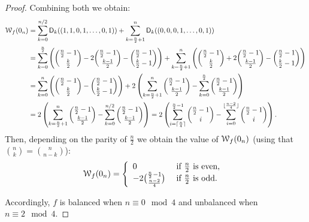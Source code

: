 \documentclass[11pt]{llncs}
\begin{document}
\begin{proof}
Combining both we obtain:
\begin{align*}
\wt{f}(0_n)&=\sum_{k=0}^{n/2}\Dnka{n}{k}{(1,1,0,1,\ldots,0,1)}+ \sum_{k=\frac{n}{2}+1}^{n}\Dnka{n}{k}{(0,0,0,1,\ldots,0,1)}\\
&=\sum_{k=0}^{\frac{n}{2}} \left(\binom{\frac{n}{2}-1}{\frac{k}{2}} -2 \binom{\frac{n}{2}-1}{\frac{k-1}{2}} - \binom{\frac{n}{2}-1}{\frac{k}{2}-1} \right)+ \sum_{k=\frac{n}{2}+1}^{n}   \left(  \binom{\frac{n}{2}-1}{\frac{k}{2}} +2 \binom{\frac{n}{2}-1}{\frac{k-1}{2}} - \binom{\frac{n}{2}-1}{\frac{k}{2}-1} \right)\\
&=\sum_{k=0}^{n}\left( \binom{\frac{n}{2}-1}{\frac{k}{2}} - \binom{\frac{n}{2}-1}{\frac{k}{2}-1}\right) 
+ 2 \left( \sum_{k=\frac{n}{2}+1}^{n} \binom{\frac{n}{2}-1}{\frac{k-1}{2}} - \sum_{k=0}^{\frac{n}{2}} \binom{\frac{n}{2}-1}{\frac{k-1}{2}}\right)\\
&=2 \left( \sum_{k=\frac{n}{2}+1}^{n} \binom{\frac{n}{2}-1}{\frac{k-1}{2}} - \sum_{k=0}^{n/2} \binom{\frac{n}{2}-1}{\frac{k-1}{2}}\right)
=2 \left( \sum_{i=\lceil \frac{n}{4} \rceil}^{\frac{n}{2}-1} \binom {\frac{n}{2}-1}{i} - \sum_{i=0}^{\lfloor\frac{n-2}{4}\rfloor} \binom{\frac{n}{2}-1}{i}\right).\\
\end{align*}
Then, depending on the parity of $\frac{n}{2}$ we obtain the value of $\wt{f}(0_n)$ (using that $\binom{n}{k}=\binom{n}{n-k}$):
	\[\wt{f}(0_n)= \left \{
\begin{array}{l l}
0 & \text{ if } \frac{n}{2} \text{ is even, } \\
-2 \binom{\frac{n}{2}-1}{\frac{n-2}{4}} & \text{ if }  \frac{n}{2} \text{ is odd.}
\end{array}\right.\]

Accordingly, $f$ is balanced when $n \equiv 0\mod 4$ and unbalanced when $n\equiv 2 \mod 4$.
\end{proof}
\end{document}
